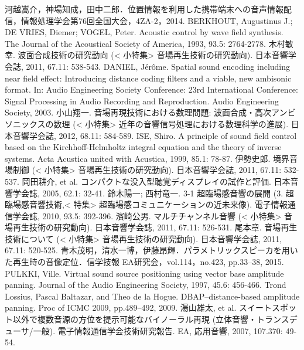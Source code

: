 \begin{thebibliography}{99}
 河越嵩介，神場知成，田中二郎．位置情報を利用した携帯端末への音声情報配信，情報処理学会第76回全国大会，4ZA-2，2014.
       BERKHOUT, Augustinus J.; DE VRIES, Diemer; VOGEL, Peter. Acoustic control by wave field synthesis. The Journal of the Acoustical Society of America, 1993, 93.5: 2764-2778.
 木村敏幸. 波面合成技術の研究動向 (< 小特集> 音場再生技術の研究動向). 日本音響学会誌, 2011, 67.11: 538-543.
       DANIEL, Jérôme. Spatial sound encoding including near field effect: Introducing distance coding filters and a viable, new ambisonic format. In: Audio Engineering Society Conference: 23rd International Conference: Signal Processing in Audio Recording and Reproduction. Audio Engineering Society, 2003.
 小山翔一. 音場再現技術における数理問題: 波面合成・高次アンビソニックスの数理 (< 小特集> 近年の音響信号処理における数理科学の進展). 日本音響学会誌, 2012, 68.11: 584-589.
       ISE, Shiro. A principle of sound field control based on the Kirchhoff-Helmholtz integral equation and the theory of inverse systems. Acta Acustica united with Acustica, 1999, 85.1: 78-87.
 伊勢史郎. 境界音場制御 (< 小特集> 音場再生技術の研究動向). 日本音響学会誌, 2011, 67.11: 532-537.
 岡田耕介, et al. コンパクトな没入型聴覚ディスプレイの試作と評価. 日本音響学会誌, 2005, 62.1: 32-41.
 鈴木陽一; 西村竜一. 3-1 超臨場感音響の展開 (3. 超臨場感音響技術,< 特集> 超臨場感コミュニケーションの近未来像). 電子情報通信学会誌, 2010, 93.5: 392-396.
 濱崎公男. マルチチャンネル音響 (< 小特集> 音場再生技術の研究動向). 日本音響学会誌, 2011, 67.11: 526-531.
 尾本章. 音場再生技術について (< 小特集> 音場再生技術の研究動向). 日本音響学会誌, 2011, 67.11: 520-525.
   青木茂明，清水一博，伊藤昂輝．パラメトリックスピーカを用いた再生時の音像定位．信学技報 EA研究会，vol.114，no.423, pp.33--38, 2015.
 PULKKI, Ville. Virtual sound source positioning using vector base amplitude panning. Journal of the Audio Engineering Society, 1997, 45.6: 456-466.
      Trond Lossius, Pascal Baltazar, and Theo de la Hogue. DBAP–distance-based amplitude panning. Proc of ICMC 2009, pp.489--492, 2009.
 湯山雄太, et al. スイートスポット以外で複数音源の方位を提示可能なバイノーラル再現 (立体音響・トランスデューサ/一般). 電子情報通信学会技術研究報告. EA, 応用音響, 2007, 107.370: 49-54.



\end{thebibliography}
